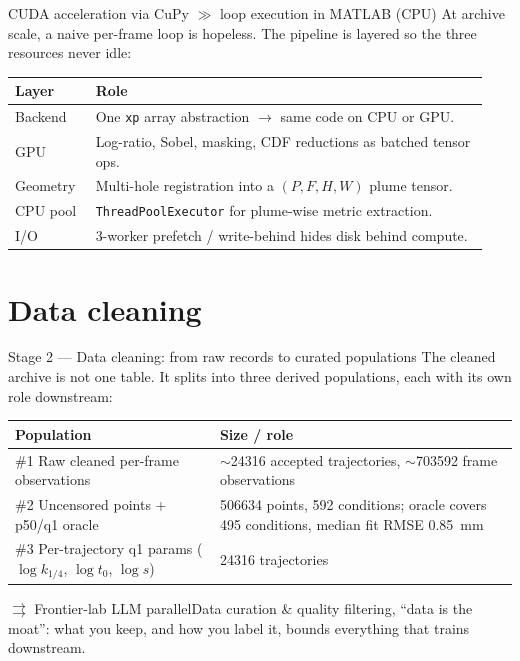 \documentclass[aspectratio=169,11pt]{beamer}
\newcommand{\blue}[1]{\textcolor{aaltoBlue}{#1}}
\newcommand{\llmparallel}[1]{%
  \begin{block}{$\rightrightarrows$ Frontier-lab LLM parallel}#1\end{block}}
\begin{document}
\begin{frame}{CUDA acceleration via CuPy $\gg$ loop execution in MATLAB (CPU)}
\small
At archive scale, a naive per-frame loop is hopeless. The pipeline is layered so the
three resources never idle:
\smallskip
\begin{center}
\begin{tabular}{L{0.16\linewidth} L{0.78\linewidth}}
\toprule
Layer & Role \\
\midrule
Backend  & One \texttt{xp} array abstraction $\to$ same code on CPU or GPU. \\
GPU      & Log-ratio, Sobel, masking, CDF reductions as batched tensor ops. \\
Geometry & Multi-hole registration into a $(P,F,H,W)$ plume tensor. \\
CPU pool & \texttt{ThreadPoolExecutor} for plume-wise metric extraction. \\
I/O      & 3-worker prefetch / write-behind hides disk behind compute. \\
\bottomrule
\end{tabular}
\end{center}
\end{frame}

\section{Data cleaning}

\begin{frame}{Stage 2 --- Data cleaning: from raw records to curated populations}
\small
The cleaned archive is not one table. It splits into three derived populations, each with its own role downstream:
\smallskip
\begin{center}
\renewcommand{\arraystretch}{1.15}
\footnotesize
\begin{tabular}{@{}L{4.6cm}L{6.1cm}@{}}
\toprule
\textbf{Population} & \textbf{Size / role} \\
\midrule
\#1 Raw cleaned per-frame observations &
$\sim$\num{24316} accepted trajectories, $\sim$\num{703592} frame observations \\
\#2 Uncensored points + p50/q1 oracle &
\num{506634} points, 592 conditions; oracle covers 495 conditions, median fit RMSE \SI{0.85}{mm} \\
\#3 Per-trajectory q1 params ($\log k_{1/4}$, $\log t_0$, $\log s$) &
\num{24316} trajectories \\
\bottomrule
\end{tabular}
\end{center}
\smallskip
\llmparallel{Data curation \& quality filtering, \blue{``data is the moat''}: what you keep, and how you label it, bounds everything that trains downstream.}
\end{frame}
\end{document}
